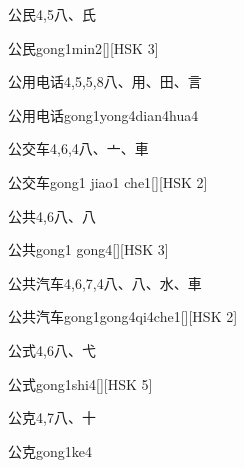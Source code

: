 \begin{entry}{公民}{4,5}{⼋、⽒}
  \begin{phonetics}{公民}{gong1min2}[][HSK 3]
  \end{phonetics}
\end{entry}

\begin{entry}{公用电话}{4,5,5,8}{⼋、⽤、⽥、⾔}
  \begin{phonetics}{公用电话}{gong1yong4dian4hua4}
  \end{phonetics}
\end{entry}

\begin{entry}{公交车}{4,6,4}{⼋、⼇、⾞}
  \begin{phonetics}{公交车}{gong1 jiao1 che1}[][HSK 2]
  \end{phonetics}
\end{entry}

\begin{entry}{公共}{4,6}{⼋、⼋}
  \begin{phonetics}{公共}{gong1 gong4}[][HSK 3]
  \end{phonetics}
\end{entry}

\begin{entry}{公共汽车}{4,6,7,4}{⼋、⼋、⽔、⾞}
  \begin{phonetics}{公共汽车}{gong1gong4qi4che1}[][HSK 2]
  \end{phonetics}
\end{entry}

\begin{entry}{公式}{4,6}{⼋、⼷}
  \begin{phonetics}{公式}{gong1shi4}[][HSK 5]
  \end{phonetics}
\end{entry}

\begin{entry}{公克}{4,7}{⼋、⼗}
  \begin{phonetics}{公克}{gong1ke4}
  \end{phonetics}
\end{entry}

